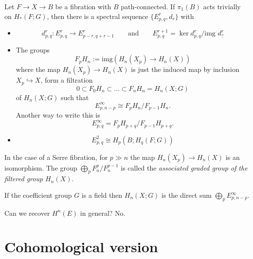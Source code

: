 \begin{theorem}
\label{theorem-serre-spect-seque-homol}
	Let $F\to X\to B$ be a fibration with $B$
	path-connected. If $\pi_1(B)$ acts trivially
	on $H_*(F;G)$, then there is a spectral
	sequence $\{E^r_{p,q},d_r\}$ with
	\begin{itemize}
		\item
			$$d^r_{p,q}:E^r_{p,q}\to
			E^r_{p-r,q+r-1}\qquad \text{and} \qquad
			E^{r+1}_{p,q}=\ker d^r_{p,q}/\text{img
			}d^r_{?}$$
		\item The groups
			$$F_pH_n:=\text{img}(H_n(X_p)\to H_n(X))$$
		where the map $H_{n}(X_p)\to H_{n}(X)$ is
		just the induced map by inclusion
		$X_p\hookrightarrow X$, form a filtration
		$$0\subset F_0H_n\subset \ldots\subset
		F_nH_n=H_n(X;G)$$
		of $H_n(X;G)$ such that
		$$E^{\infty}_{p,n-p}\cong
		F_pH_n/F_{p-1}H_n.$$
		Another way to write this is
		$$E_{p,q}^{\infty}=F_pH_{p+q}\Big/F_{p-1}
		H_{p+q}.$$
	\item $$E^2_{p,q}\cong H_p(B;H_q(F;G))$$
\end{itemize}
\end{theorem}

\begin{remark}
\label{remark-case-serre-fibra-p-n-map}
	In the case of a Serre fibration, for $p\gg
	n$ the map $H_{n}(X_p)\to H_{n}(X)$ is an
	isomorphism. The group
	$\bigoplus_{p}F^p_n/F^{p-1}_n$ is called the
	{\it associated graded group of the filtered
	group $H_n(X)$}.
\end{remark}

\begin{remark}
\label{remark-quote-from-hatcher}
	If the coefficient group $G$ is a field then
	$H_{n}(X;G)$ is the direct sum
	$\bigoplus_{p} E^{\infty}_{p,n-p}$.
\end{remark}

\begin{remark}
\label{remark-can-we-recov-h-n-e-gener}
	Can we recover $H^{n}(E)$ in general? No.
\end{remark}

\section{Cohomological version}
\label{section-cohomological-version}


